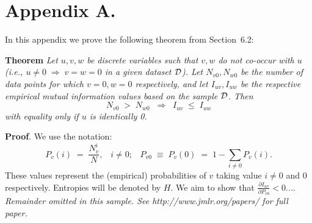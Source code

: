 \documentclass[twoside,11pt]{article}
\newcommand{\dataset}{{\cal D}}
\newcommand{\fracpartial}[2]{\frac{\partial #1}{\partial  #2}}
\begin{document}



\newpage

\appendix
\section*{Appendix A.}
\label{app:theorem}



In this appendix we prove the following theorem from
Section~6.2:

\noindent
{\bf Theorem} {\it Let $u,v,w$ be discrete variables such that $v, w$ do
not co-occur with $u$ (i.e., $u\neq0\;\Rightarrow \;v=w=0$ in a given
dataset $\dataset$). Let $N_{v0},N_{w0}$ be the number of data points for
which $v=0, w=0$ respectively, and let $I_{uv},I_{uw}$ be the
respective empirical mutual information values based on the sample
$\dataset$. Then
\[
	N_{v0} \;>\; N_{w0}\;\;\Rightarrow\;\;I_{uv} \;\leq\;I_{uw}
\]
with equality only if $u$ is identically 0.} \hfill\BlackBox

\noindent
{\bf Proof}. We use the notation:
\[
P_v(i) \;=\;\frac{N_v^i}{N},\;\;\;i \neq 0;\;\;\;
P_{v0}\;\equiv\;P_v(0)\; = \;1 - \sum_{i\neq 0}P_v(i).
\]
These values represent the (empirical) probabilities of $v$
taking value $i\neq 0$ and 0 respectively.  Entropies will be denoted
by $H$. We aim to show that $\fracpartial{I_{uv}}{P_{v0}} < 0$....\\

{\noindent \em Remainder omitted in this sample. See http://www.jmlr.org/papers/ for full paper.}


\vskip 0.2in

\end{document}
